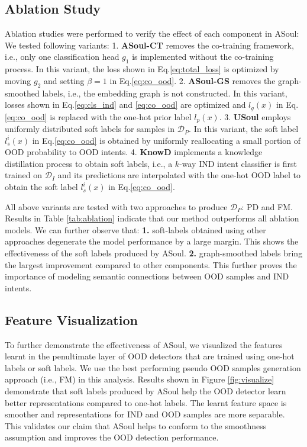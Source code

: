 \documentclass[11pt]{article}
\begin{document}
\subsection{Ablation Study}
Ablation studies were performed to verify the effect of each component in ASoul:
We tested following variants:
1. \textbf{ASoul-CT} removes the co-training framework, i.e., only one classification head $g_1$ is implemented without the co-training process.
In this variant, the loss shown in Eq.\ref{eq:total_loss} is optimized by moving $g_2$ and setting $\beta=1$ in Eq.\ref{eq:co_ood}.
2. \textbf{ASoul-GS} removes the graph-smoothed labels, i.e., the embedding graph is not constructed. 
In this variant, losses shown in Eq.\ref{eq:cls_ind} and \ref{eq:co_ood} are optimized and $l_g(x)$ in Eq.\ref{eq:co_ood} is replaced with the one-hot prior label $l_p(x)$.
3. \textbf{USoul} employs uniformly distributed soft labels for samples in $\mathcal{D}_P$.
In this variant, the soft label $l_s^i(x)$ in Eq.\ref{eq:co_ood} is obtained by uniformly reallocating a small portion of OOD probability to OOD intents.
4. \textbf{KnowD} implements a knowledge distillation process to obtain soft labels,
i.e., a $k$-way IND intent classifier is first trained on $\mathcal{D}_I$ and its predictions are interpolated with the one-hot OOD label to obtain the soft label $l_s^i(x)$ in Eq.\ref{eq:co_ood}.

All above variants are tested with two approaches to produce $\mathcal{D}_P$: PD and FM. Results in Table \ref{tab:ablation} indicate that our method outperforms all ablation models.
We can further observe that:
\textbf{1.} soft-labels obtained using other approaches degenerate the model performance by a large margin.
This shows the effectiveness of the soft labels produced by ASoul.
\textbf{2.} graph-smoothed labels bring the largest improvement compared to other components.
This further proves the importance of modeling semantic connections between OOD samples and IND intents.

\subsection{Feature Visualization}
To further demonstrate the effectiveness of ASoul, we visualized the features learnt in the penultimate layer of OOD detectors that are trained using one-hot labels or soft labels. We use the best performing pseudo OOD samples generation approach (i.e., FM) in this analysis. Results shown in Figure \ref{fig:visualize} demonstrate that soft labels produced by ASoul help the OOD detector learn better representations compared to one-hot labels. The learnt feature space is smoother and representations for IND and OOD samples are more separable. This validates our claim that ASoul helps to conform to the smoothness assumption and improves the OOD detection performance.
\end{document}
